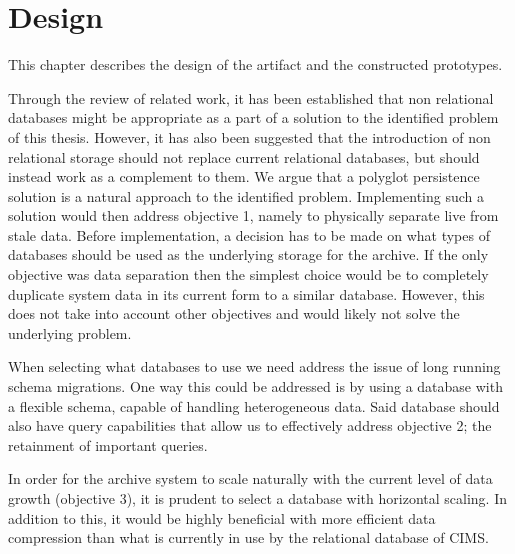 \chapter{Design}
\label{chap:design}


This chapter describes the design of the artifact and the constructed prototypes.

Through the review of related work, it has been established that non relational databases might be appropriate as a part of a solution to the identified problem of this thesis. However, it has also been suggested \cite{NoSQLSurvey} that the introduction of non relational storage should not replace current relational databases, but should instead work as a complement to them. We argue that a polyglot persistence solution is a natural approach to the identified problem. Implementing such a solution would then address objective 1, namely to physically separate live from stale data. Before implementation, a decision has to be made on what types of databases should be used as the underlying storage for the archive. If the only objective was data separation then the simplest choice would be to completely duplicate system data in its current form to a similar database. However, this does not take into account other objectives and would likely not solve the underlying problem. 

When selecting what databases to use we need address the issue of long running schema migrations. One way this could be addressed is by using a database with a flexible schema, capable of handling heterogeneous data. Said database should also have query capabilities that allow us to effectively address objective 2; the retainment of important queries.

In order for the archive system to scale naturally with the current level of data growth (objective 3), it is prudent to select a database with horizontal scaling. In addition to this, it would be highly beneficial with more efficient data compression than what is currently in use by the relational database of CIMS.

